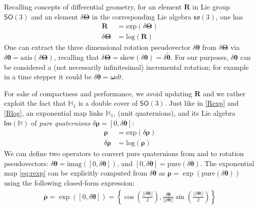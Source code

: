 \documentclass[review]{elsarticle}
\def\avect#1{{\boldsymbol{#1}}}
\def\amatr#1{{\boldsymbol{#1}}}
\begin{document}
Recalling concepts of differential geometry, for an element $\amatr{R}$ in Lie group $\mathsf{SO}(3)$ and an element $\delta\amatr{\Theta}$ in the corresponding Lie algebra $\mathfrak{so}(3)$, one has
%
\begin{align}
\amatr{R}      &= \mathrm{exp}(\delta\amatr{\Theta}) \label{Rexp}\\
\delta\amatr{\Theta} &= \mathrm{log}(\amatr{R}) \label{Rlog}
\end{align}
%
One can extract the three dimensional rotation pseudovector $\delta\avect{\theta}$ from $\delta\amatr{\Theta}$ via $\delta\avect{\theta} = \text{axis}(\delta\amatr{\Theta})$, recalling that $\delta\amatr{\Theta} =  \mathrm{skew}(\delta\avect{\theta}) = \delta\tilde{\avect{\theta}}$. 
For our purposes, $\delta\avect{\theta}$ can be considered a (not necessarily infinitesimal) incremental rotation; for example in a time stepper it could be $\delta\avect{\theta} =  \avect{\omega} dt$.

For sake of compactness and performance, we avoid updating $\amatr{R}$ and we rather exploit the fact that $\mathbb{H}_1$ is a double cover of $\mathsf{SO}(3)$. Just like in \eqref{Rexp} and \eqref{Rlog}, an exponential map links $\mathbb{H}_1$, (unit  quaternions), and its Lie algebra $\mathsf{Im}(\mathbb{H})$ of \emph{pure quaternions} $\delta\avect{\rho} = [0,\delta\avect{\theta}]$:
%
\begin{align}
\avect{\rho}      &= \mathrm{exp}(\delta\avect{\rho}) \label{eq:rexp}\\
\delta\avect{\rho} &= \mathrm{log}(\avect{\rho})   \label{eq:rlog}
\end{align}
%
We can define two operators to convert pure quaternions from and to rotation pseudovectors: 
$\delta\avect{\theta}= \text{imag}([0,\delta\avect{\theta}])$,
and
$[0,\delta\avect{\theta}]= \text{pure}(\delta\avect{\theta})$.
The exponential map \eqref{eq:rexp} can be explicitly computed from $\delta\avect{\theta}$ as $\avect{\rho} = \exp (\text{pure}(\delta\avect{\theta}))$ using the following closed-form expression:
%
\begin{align}
\avect{\rho} =
\exp ([0, \delta\avect{\theta}]) = 
\left\{ 
\cos\left(\frac{||\delta\avect{\theta}||}{2}\right), 
\frac{\delta\avect{\theta} }{ ||\delta\avect{\theta}|| } \sin\left( \frac{||\delta\avect{\theta}||}{2}\right) 
\right\} \label{eq:qexponential}
\end{align}
\end{document}
